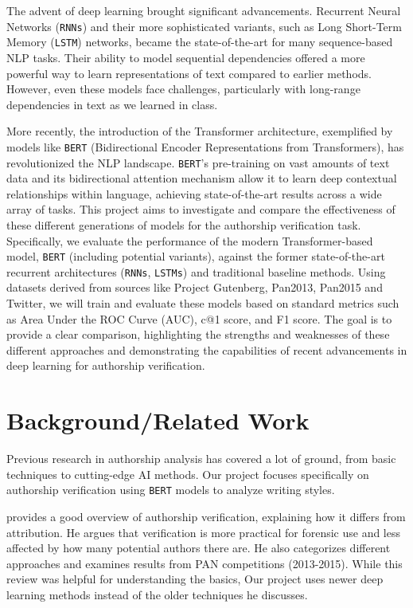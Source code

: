 \documentclass[12pt,a4paper]{article}
\begin{document}
The advent of deep learning brought significant advancements. Recurrent Neural Networks (\texttt{RNNs}) and their more sophisticated variants, such as Long Short-Term Memory (\texttt{LSTM}) networks, became the state-of-the-art for many sequence-based NLP tasks. Their ability to model sequential dependencies offered a more powerful way to learn representations of text compared to earlier methods. However, even these models face challenges, particularly with long-range dependencies in text as we learned in class.

More recently, the introduction of the Transformer architecture, exemplified by models like \texttt{BERT} (Bidirectional Encoder Representations from Transformers), has revolutionized the NLP landscape. \texttt{BERT}'s pre-training on vast amounts of text data and its bidirectional attention mechanism allow it to learn deep contextual relationships within language, achieving state-of-the-art results across a wide array of tasks. This project aims to investigate and compare the effectiveness of these different generations of models for the authorship verification task. Specifically, we evaluate the performance of the modern Transformer-based model, \texttt{BERT} (including potential variants), against the former state-of-the-art recurrent architectures (\texttt{RNNs}, \texttt{LSTMs}) and traditional baseline methods. Using datasets derived from sources like Project Gutenberg, Pan2013, Pan2015 and Twitter, we will train and evaluate these models based on standard metrics such as Area Under the ROC Curve (AUC), c@1 score, and F1 score. The goal is to provide a clear comparison, highlighting the strengths and weaknesses of these different approaches and demonstrating the capabilities of recent advancements in deep learning for authorship verification.

\section{Background/Related Work}
Previous research in authorship analysis has covered a lot of ground, from basic techniques to cutting-edge AI methods. Our project focuses specifically on authorship verification using \texttt{BERT} models to analyze writing styles.

\citet{stamatatos2016review} provides a good overview of authorship verification, explaining how it differs from attribution. He argues that verification is more practical for forensic use and less affected by how many potential authors there are. He also categorizes different approaches and examines results from PAN competitions (2013-2015). While this review was helpful for understanding the basics, Our project uses newer deep learning methods instead of the older techniques he discusses.
\end{document}
